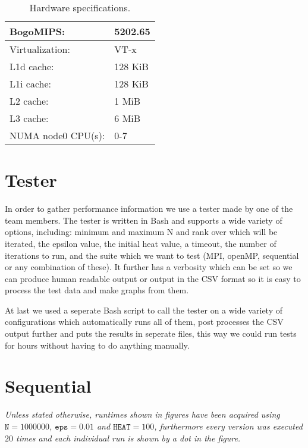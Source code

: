 \documentclass[a4paper]{article}
\begin{document}
\begin{table}[h]
\begin{tabular}{|l|l|}
        BogoMIPS:            &    5202.65\\\hline
        Virtualization:      &    VT-x\\\hline
        L1d cache:           &    128 KiB\\\hline
        L1i cache:           &    128 KiB\\\hline
        L2 cache:            &    1 MiB\\\hline
        L3 cache:            &    6 MiB\\\hline
        NUMA node0 CPU(s):   &    0-7\\
        \hline
    \end{tabular}
    \caption{Hardware specifications.}
    \label{tab: hardware}
\end{table}

\section{Tester}
In order to gather performance information we use a tester made by one of the team members. The tester is written in Bash and supports a wide variety of options, including: minimum and maximum N and rank over which will be iterated, the epsilon value, the initial heat value, a timeout, the number of iterations to run, and the suite which we want to test (MPI, openMP, sequential or any combination of these). It further has a verbosity which can be set so we can produce human readable output or output in the CSV format so it is easy to process the test data and make graphs from them.

At last we used a seperate Bash script to call the tester on a wide variety of configurations which automatically runs all of them, post processes the CSV output further and puts the results in seperate files, this way we could run tests for hours without having to do anything manually.

    
\section{Sequential}
\textit{Unless stated otherwise, runtimes shown in figures have been acquired using $\texttt{N} = 1000000$, $\texttt{eps} = 0.01$ and $\texttt{HEAT} = 100$, furthermore every version was executed $20$ times and each individual run is shown by a dot in the figure.}\\
\end{document}
